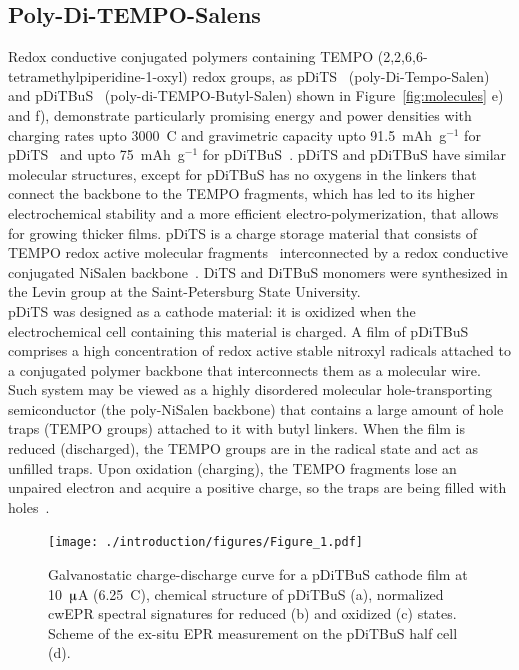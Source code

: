 \subsection{Poly-Di-TEMPO-Salens}
Redox conductive conjugated polymers containing TEMPO (2,2,6,6-tetramethylpiperidine-1-oxyl) redox groups, as pDiTS~\cite{Vereshchagin2020,Kulikov2022} (poly-Di-Tempo-Salen) and pDiTBuS~\cite{Kulikov2023} (poly-di-TEMPO-Butyl-Salen) shown in Figure~\ref{fig:molecules} e) and f), demonstrate particularly promising energy and power densities with charging rates upto 3000~C and gravimetric capacity upto 91.5~mAh~g$^{-1}$ for pDiTS~\cite{Vereshchagin2020} and upto 75~mAh~g$^{-1}$ for pDiTBuS~\cite{Kulikov2023}. pDiTS and pDiTBuS have similar molecular structures, except for pDiTBuS has no oxygens in the linkers that connect the backbone to the TEMPO fragments, which has led to its higher electrochemical stability and a more efficient electro-polymerization, that allows for growing thicker films. pDiTS is a charge storage material that consists of TEMPO redox active molecular fragments~\cite{Vereshchagin2022,jeschke2012_annrevphyschem,Halbmair2016} interconnected by a redox conductive conjugated NiSalen backbone~\cite{Vereshchagin2020,Dmitrieva2018}. DiTS and DiTBuS monomers were synthesized in the Levin group at the Saint-Petersburg State University.\\
pDiTS was designed as a cathode material: it is oxidized when the electrochemical cell containing this material is charged. A film of pDiTBuS comprises a high concentration of redox active stable nitroxyl radicals attached to a conjugated polymer backbone that interconnects them as a molecular wire. Such system may be viewed as a highly disordered molecular hole-transporting semiconductor (the poly-NiSalen backbone) that contains a large amount of hole traps (TEMPO groups) attached to it with butyl linkers. When the film is reduced (discharged), the TEMPO groups are in the radical state and act as unfilled traps. Upon oxidation (charging), the TEMPO fragments lose an unpaired electron and acquire a positive charge, so the traps are being filled with holes~\cite{Kulikov2023}.

\begin{figure}[h]
\center
	\texttt{[image: ./introduction/figures/Figure\_1.pdf]}
	\caption{Galvanostatic charge-discharge curve for a pDiTBuS cathode film at 10~$\muup$A (6.25~C), chemical structure of pDiTBuS (a), normalized cwEPR spectral signatures for reduced (b) and oxidized (c) states. Scheme of the ex-situ EPR measurement on the pDiTBuS half cell (d).}
	\label{fig:Figure_1}
\end{figure}


